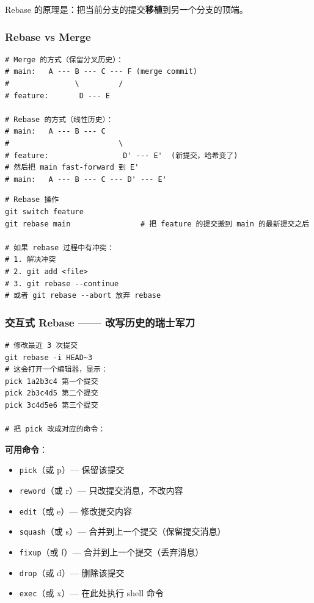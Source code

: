 \documentclass[12pt,a4paper]{article}
\begin{document}
Rebase 的原理是：把当前分支的提交\textbf{移植}到另一个分支的顶端。

\subsubsection{Rebase vs Merge}

\begin{lstlisting}[numbers=none]
# Merge 的方式（保留分叉历史）：
# main:   A --- B --- C --- F (merge commit)
#               \         /
# feature:       D --- E

# Rebase 的方式（线性历史）：
# main:   A --- B --- C
#                         \
# feature:                 D' --- E'  (新提交，哈希变了)
# 然后把 main fast-forward 到 E'
# main:   A --- B --- C --- D' --- E'
\end{lstlisting}

\begin{lstlisting}
# Rebase 操作
git switch feature
git rebase main                # 把 feature 的提交搬到 main 的最新提交之后

# 如果 rebase 过程中有冲突：
# 1. 解决冲突
# 2. git add <file>
# 3. git rebase --continue
# 或者 git rebase --abort 放弃 rebase
\end{lstlisting}

\subsubsection{交互式 Rebase —— 改写历史的瑞士军刀}

\begin{lstlisting}
# 修改最近 3 次提交
git rebase -i HEAD~3
# 这会打开一个编辑器，显示：
pick 1a2b3c4 第一个提交
pick 2b3c4d5 第二个提交
pick 3c4d5e6 第三个提交

# 把 pick 改成对应的命令：
\end{lstlisting}

\textbf{可用命令}：
\begin{itemize}[itemsep=3pt]
    \item \texttt{pick}（或 p）— 保留该提交
    \item \texttt{reword}（或 r）— 只改提交消息，不改内容
    \item \texttt{edit}（或 e）— 修改提交内容
    \item \texttt{squash}（或 s）— 合并到上一个提交（保留提交消息）
    \item \texttt{fixup}（或 f）— 合并到上一个提交（丢弃消息）
    \item \texttt{drop}（或 d）— 删除该提交
    \item \texttt{exec}（或 x）— 在此处执行 shell 命令
\end{itemize}
\end{document}
